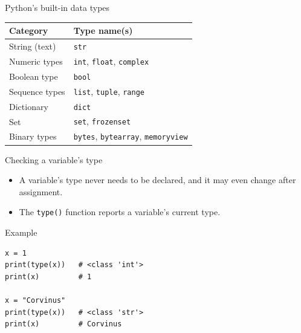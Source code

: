 \documentclass[aspectratio=169,11pt]{beamer}
\begin{document}
\begin{frame}{Python's built-in data types}
  \small
  \begin{tabular}{ll}
    \toprule
    Category & Type name(s) \\
    \midrule
    String (text) & \texttt{str} \\
    Numeric types & \texttt{int}, \texttt{float}, \texttt{complex} \\
    Boolean type & \texttt{bool} \\
    Sequence types & \texttt{list}, \texttt{tuple}, \texttt{range} \\
    Dictionary & \texttt{dict} \\
    Set & \texttt{set}, \texttt{frozenset} \\
    Binary types & \texttt{bytes}, \texttt{bytearray}, \texttt{memoryview} \\
    \bottomrule
  \end{tabular}
\end{frame}

\begin{frame}[fragile]{Checking a variable's type}
  \begin{itemize}
    \item A variable's type never needs to be declared, and it may even change
          after assignment.
    \item The \texttt{type()} function reports a variable's current type.
  \end{itemize}
  \begin{block}{Example}
\begin{verbatim}
x = 1
print(type(x))   # <class 'int'>
print(x)         # 1

x = "Corvinus"
print(type(x))   # <class 'str'>
print(x)         # Corvinus
\end{verbatim}
  \end{block}
\end{frame}

\end{document}
